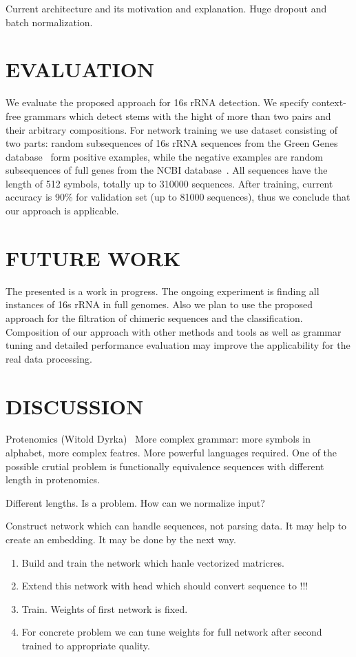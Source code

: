 \documentclass[a4paper,twoside]{article}
\begin{document}
Current architecture and its motivation and explanation.
Huge dropout and batch normalization.

\section{\uppercase{Evaluation}}
\label{sec:evaluation}

\noindent We evaluate the proposed approach for 16s rRNA detection.
We specify context-free grammars which detect stems with the hight of more than two pairs and their arbitrary compositions.
For network training we use dataset consisting of two parts: random subsequences of 16s rRNA sequences from the Green Genes database~\cite{pmid16820507} form positive examples, while the negative examples are random subsequences of full genes from the NCBI database~\cite{pmid19854944}.
All sequences have the length of 512 symbols, totally up to 310000 sequences.
After training, current accuracy is 90\% for validation set (up to 81000 sequences), thus we conclude that our approach is applicable.

\section{\uppercase{Future Work}}
\label{sec:FutureWork}

\noindent The presented is a work in progress. 
The ongoing experiment is finding all instances of 16s rRNA in full genomes.
Also we plan to use the proposed approach for the filtration of chimeric sequences and the classification.
Composition of our approach with other methods and tools as well as grammar tuning and detailed performance evaluation may improve the applicability for the real data processing.


\section{\uppercase{Discussion}}
\label{sec:Discussion}

Protenomics (Witold Dyrka)~\cite{DBLP:Witold:Proteins}
More complex grammar: more symbols in alphabet, more complex featres.
More powerful languages required.
One of the possible crutial problem is functionally equivalence sequences with different length in protenomics.

Different lengths. Is a problem.
How can we normalize input?

Construct network which can handle sequences, not parsing data.
It may help to create an embedding.
It may be done by the next way.
\begin{enumerate}
\item Build and train the network which hanle vectorized matricres.
\item Extend this network with head which should convert sequence to !!!
\item Train. Weights of first network is fixed.
\item For concrete problem we can tune weights for full network after second trained to appropriate quality.
\end{enumerate}
\end{document}
